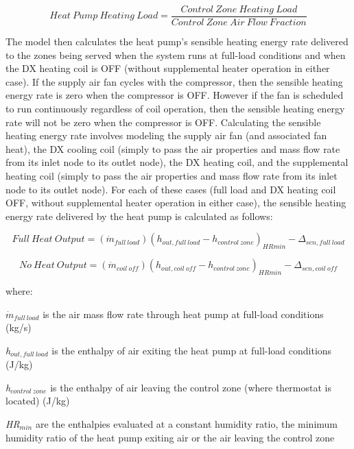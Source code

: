 \begin{equation}
Heat~Pump~Heating~Load = \frac{{Control~Zone~Heating~Load}}{{Control~Zone~Air~Flow~Fraction}}
\end{equation}

The model then calculates the heat pump's sensible heating energy rate delivered to the zones being served when the system runs at full-load conditions and when the DX heating coil is OFF (without supplemental heater operation in either case). If the supply air fan cycles with the compressor, then the sensible heating energy rate is zero when the compressor is OFF. However if the fan is scheduled to run continuously regardless of coil operation, then the sensible heating energy rate will not be zero when the compressor is OFF. Calculating the sensible heating energy rate involves modeling the supply air fan (and associated fan heat), the DX cooling coil (simply to pass the air properties and mass flow rate from its inlet node to its outlet node), the DX heating coil, and the supplemental heating coil (simply to pass the air properties and mass flow rate from its inlet node to its outlet node). For each of these cases (full load and DX heating coil OFF, without supplemental heater operation in either case), the sensible heating energy rate delivered by the heat pump is calculated as follows:

\begin{equation}
Full~Heat~Output = ({\dot{m}_{full~load}}){({h_{out,full~load}} - {h_{control~zone}})_{HRmin}} - {\Delta_{sen,full~load}}
\end{equation}

\begin{equation}
No~Heat~Output = ({\dot{m}_{coil~off}}){({h_{out,coil~off}} - {h_{control~zone}})_{HRmin}} - {\Delta_{sen,coil~off}}
\end{equation}

where:

\({\dot{m}_{full~load}}\) is the air mass flow rate through heat pump at full-load conditions (kg/s)

\emph{h\(_{out,full~load}\)} is the enthalpy of air exiting the heat pump at full-load conditions (J/kg)

\emph{h\(_{control~zone}\)} is the enthalpy of air leaving the control zone (where thermostat is located) (J/kg)

\emph{HR\(_{min}\)} are the enthalpies evaluated at a constant humidity ratio, the minimum humidity ratio of the heat pump exiting air or the air leaving the control zone

